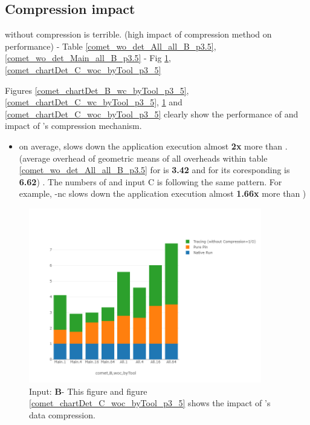 \subsection{Compression impact} 
\label{subsec:compact}
\parlot without compression is terrible. (high impact of compression method on performance)
 - Table \ref{comet_wo_det_All_all_B_p3.5}, \ref{comet_wo_det_Main_all_B_p3.5}
   - Fig \ref{comet_chartDet_B_woc_byTool_p3_5}, \ref{comet_chartDet_C_woc_byTool_p3_5}
   
Figures \ref{comet_chartDet_B_wc_byTool_p3_5}, \ref{comet_chartDet_C_wc_byTool_p3_5}, \ref{comet_chartDet_B_woc_byTool_p3_5} and \ref{comet_chartDet_C_woc_byTool_p3_5} clearly show the performance of \parlot and impact of \parlot 's compression mechanism.
	
\begin{itemize}
\item on average, \parlotnc slows down the application execution almost \textbf{2x} more than \parlota. (average overhead of geometric means of all overheads within table  \ref{comet_wo_det_All_all_B_p3.5} for \parlota is \textbf{3.42} and for its coresponding \parlotnc is \textbf{6.62}) . The numbers of \parlotm and input C is following the same pattern. For example, \parlot-nc slows down the application execution almost \textbf{1.66x} more than \parlotm)
\end{itemize}

\begin{figure}[!t]
\centering
\includegraphics[width=4in]{figs.comet.newMed/comet_chartDet_B_woc_byTool_p3_5.png}
\caption{ Input: \textbf{B}- This figure and figure \ref{comet_chartDet_C_woc_byTool_p3_5} shows the impact of \parlot 's data compression.
}
\label{comet_chartDet_B_woc_byTool_p3_5}
\end{figure}

